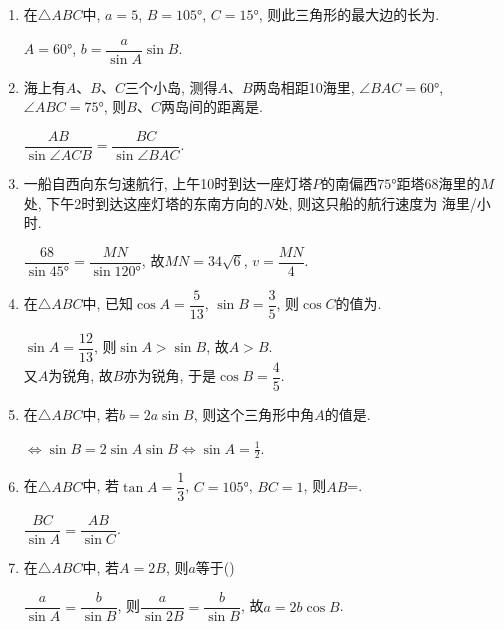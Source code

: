 \begin{enumerate}
\item  在$\triangle{ABC}$中, $a=5$, $B=\ang{105}$, $C=\ang{15}$, 则此三角形的最大边的长为.
\begin{jieda}
$A=\ang{60}$, $b=\dfrac{a}{\sin{A}}\sin{B}$. 
\end{jieda}

\item 海上有$A$、$B$、$C$三个小岛, 测得$A$、$B$两岛相距10海里, $\angle{BAC}=\ang{60}$, $\angle{ABC}=\ang{75}$, 则$B$、$C$两岛间的距离是. 
\begin{jieda}
$\dfrac{AB}{\sin\angle{ACB}}=\dfrac{BC}{\sin\angle{BAC}}$. 
\end{jieda}

\item 一船自西向东匀速航行, 上午10时到达一座灯塔$P$的南偏西$\ang{75}$距塔68海里的$M$处, 下午2时到达这座灯塔的东南方向的$N$处, 
则这只船的航行速度为 海里/小时. 
\begin{jieda}
$\dfrac{68}{\sin\ang{45}}=\dfrac{MN}{\sin\ang{120}}$, 故$MN=34\sqrt{6}$, $v=\dfrac{MN}{4}$. 
\end{jieda}

\item 在$\triangle{ABC}$中, 已知$\cos{A}=\dfrac{5}{13}$, $\sin{B}=\dfrac{3}{5}$, 则$\cos{C}$的值为. 
\begin{jieda}
$\sin{A}=\dfrac{12}{13}$, 则$\sin{A}>\sin{B}$, 故$A>B$. \\
又$A$为锐角, 故$B$亦为锐角, 于是$\cos{B}=\dfrac{4}{5}$. 
\end{jieda}

\item 在$\triangle{ABC}$中, 若$b=2a\sin{B}$, 则这个三角形中角$A$的值是. 
\begin{jieda}
$\iff \sin{B}=2\sin{A}\sin{B}\iff \sin{A}=\frac{1}{2}$. 
\end{jieda}

\item 在$\triangle{ABC}$中, 若$\tan{A}=\dfrac{1}{3}$, $C=\ang{105}$, $BC=1$, 则$AB$=. 
\begin{jieda}
$\dfrac{BC}{\sin{A}}=\dfrac{AB}{\sin{C}}$. 
\end{jieda}

\item 在$\triangle{ABC}$中, 若$A=2B$, 则$a$等于\dotfill()
\begin{jieda}
$\dfrac{a}{\sin{A}}=\dfrac{b}{\sin{B}}$, 则$\dfrac{a}{\sin2B}=\dfrac{b}{\sin{B}}$, 故$a=2b\cos{B}$. 
\end{jieda}


\end{enumerate}
